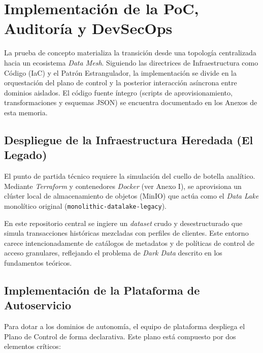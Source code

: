 \documentclass[12pt, a4paper]{article}
\begin{document}
\section{Implementación de la PoC, Auditoría y DevSecOps}

La prueba de concepto materializa la transición desde una topología centralizada hacia un ecosistema \textit{Data Mesh}. Siguiendo las directrices de Infraestructura como Código (IaC) y el Patrón Estrangulador, la implementación se divide en la orquestación del plano de control y la posterior interacción asíncrona entre dominios aislados. El código fuente íntegro (scripts de aprovisionamiento, transformaciones y esquemas JSON) se encuentra documentado en los Anexos de esta memoria.

\subsection{Despliegue de la Infraestructura Heredada (El Legado)}

El punto de partida técnico requiere la simulación del cuello de botella analítico. Mediante \textit{Terraform} y contenedores \textit{Docker} (ver Anexo I), se aprovisiona un clúster local de almacenamiento de objetos (MinIO) que actúa como el \textit{Data Lake} monolítico original (\texttt{monolithic-datalake-legacy}). 

En este repositorio central se ingiere un \textit{dataset} crudo y desestructurado que simula transacciones históricas mezcladas con perfiles de clientes. Este entorno carece intencionadamente de catálogos de metadatos y de políticas de control de acceso granulares, reflejando el problema de \textit{Dark Data} descrito en los fundamentos teóricos.

\subsection{Implementación de la Plataforma de Autoservicio}

Para dotar a los dominios de autonomía, el equipo de plataforma despliega el Plano de Control de forma declarativa. Este plano está compuesto por dos elementos críticos:
\end{document}
